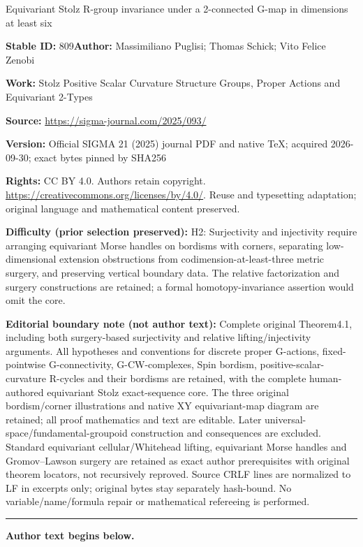 \documentclass[11pt]{article}
\numberwithin{equation}{section}
\numberwithin{equation}{section}
\begin{document}
\begin{center}\Large Equivariant Stolz R-group invariance under a 2-connected G-map in dimensions at least six\end{center}
\noindent\textbf{Stable ID:} 809\quad\textbf{Author:} Massimiliano Puglisi; Thomas Schick; Vito Felice Zenobi\par
\noindent\textbf{Work:} Stolz Positive Scalar Curvature Structure Groups, Proper Actions and Equivariant 2-Types\par
\noindent\textbf{Source:} \url{https://sigma-journal.com/2025/093/}\par
\noindent\textbf{Version:} Official SIGMA 21 (2025) journal PDF and native TeX; acquired 2026-09-30; exact bytes pinned by SHA256\par
\noindent\textbf{Rights:} CC BY 4.0. Authors retain copyright. \url{https://creativecommons.org/licenses/by/4.0/}. Reuse and typesetting adaptation; original language and mathematical content preserved.\par
\noindent\textbf{Difficulty (prior selection preserved):} {\CJKfont H2: Surjectivity and injectivity require arranging equivariant Morse handles on bordisms with corners, separating low-dimensional extension obstructions from codimension-at-least-three metric surgery, and preserving vertical boundary data. The relative factorization and surgery constructions are retained; a formal homotopy-invariance assertion would omit the core.}\par
\medskip\noindent\textbf{Editorial boundary note (not author text):} Complete original Theorem4.1, including both surgery-based surjectivity and relative lifting/injectivity arguments. All hypotheses and conventions for discrete proper G-actions, fixed-pointwise G-connectivity, G-CW-complexes, Spin bordism, positive-scalar-curvature R-cycles and their bordisms are retained, with the complete human-authored equivariant Stolz exact-sequence core. The three original bordism/corner illustrations and native XY equivariant-map diagram are retained; all proof mathematics and text are editable. Later universal-space/fundamental-groupoid construction and consequences are excluded. Standard equivariant cellular/Whitehead lifting, equivariant Morse handles and Gromov–Lawson surgery are retained as exact author prerequisites with original theorem locators, not recursively reproved. Source CRLF lines are normalized to LF in excerpts only; original bytes stay separately hash-bound. No variable/name/formula repair or mathematical refereeing is performed.\par
\medskip\hrule\medskip\noindent\textbf{Author text begins below.}\par
\setcounter{section}{1}
\end{document}
